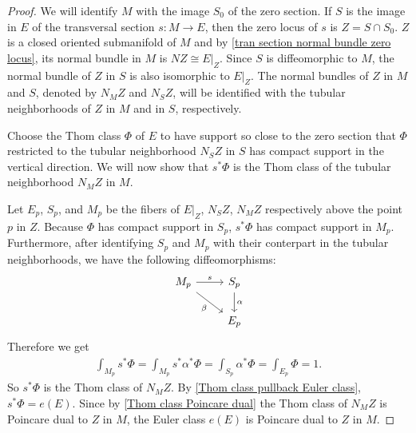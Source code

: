 \begin{proof}
We will identify $M$ with the image $S_0$ of the zero section. If $S$ is the image in $E$ of the transversal section $s:M\to E$, then the zero locus of $s$ is $Z=S\cap S_0$. 
$Z$ is a closed oriented submanifold of $M$ and by \cref{tran section normal bundle zero locus}, its normal bundle in $M$ is $NZ\cong E|_Z$. Since $S$ is 
diffeomorphic to $M$, the normal bundle of $Z$ in $S$ is also isomorphic to $E|_Z$. The normal bundles of $Z$ in $M$ and $S$, denoted by $N_MZ$ and $N_SZ$, will be 
identified with the tubular neighborhoods of $Z$ in $M$ and in $S$, respectively.\par
Choose the Thom class $\Phi$ of $E$ to have support so close to the zero section that $\Phi$ restricted to the tubular neighborhood $N_SZ$ in $S$ has compact support 
in the vertical direction. We will now show that $s^*\Phi$ is the Thom class of the tubular neighborhood $N_MZ$ in $M$.\par
Let $E_p$, $S_p$, and $M_p$ be the fibers of $E|_Z$, $N_SZ$, $N_MZ$ respectively above the point $p$ in $Z$. Because $\Phi$ has compact support in $S_p$, $s^*\Phi$ 
has compact support in $M_p$. Furthermore, after identifying $S_p$ and $M_p$ with their conterpart in the tubular neighborhoods, we have the following diffeomorphisms:
\[\begin{tikzcd}
M_p\ar[rd,swap,"\beta"]\ar[r,"s"]&S_p\ar[d,"\alpha"]\\
&E_p
\end{tikzcd}\]
Therefore we get
\begin{align*}
\int_{M_p}s^*\Phi=\int_{M_p}s^*\alpha^*\Phi=\int_{S_p}\alpha^*\Phi=\int_{E_p}\Phi=1.
\end{align*}
So $s^*\Phi$ is the Thom class of $N_MZ$. By \cref{Thom class pullback Euler class}, $s^*\Phi=e(E)$. Since by \cref{Thom class Poincare dual} the 
Thom class of $N_MZ$ is Poincare dual to $Z$ in $M$, the Euler class $e(E)$ is Poincare dual to $Z$ in $M$.
\end{proof}
